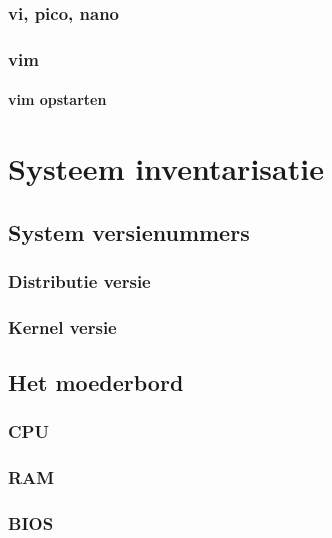 \documentclass[a4paper,12pt,twoside,openright,titlepage]{book}
\begin{document}
\subsection{vi, pico, nano}

\subsection{vim}

\subsubsection{vim opstarten}






\chapter{Systeem inventarisatie}

\section{System versienummers}

\subsection{Distributie versie}

\subsection{Kernel versie}

\section{Het moederbord}
\subsection{CPU}

\subsection{RAM}

\subsection{BIOS}

\end{document}
